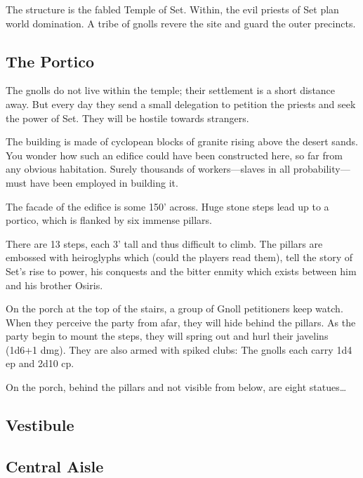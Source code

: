 \documentclass[letterpaper,serif]{rpg-module}
\begin{document}
The structure is the fabled Temple of Set. Within, the evil priests of Set plan world domination.
A tribe of gnolls revere the site and guard the outer precincts.

\subsection{The Portico} %
\label{portico}

The gnolls do not live within the temple; their settlement is a short distance away. But every day they
send a small delegation to petition the priests and seek the power of Set. They will be hostile towards
strangers.

\begin{boxtext}
The building is made of cyclopean blocks of granite rising above the desert sands. You wonder how such
an edifice could have been constructed here, so far from any obvious habitation. Surely thousands of
workers---slaves in all probability---must have been employed in building it.

The facade of the edifice is some 150' across. Huge stone steps lead up to a portico, which is flanked
by six immense pillars.
\end{boxtext}

There are 13 steps, each 3' tall and thus difficult to climb. The pillars are embossed with heiroglyphs
which (could the players read them), tell the story of Set's rise to power, his conquests and the
bitter enmity which exists between him and his brother Osiris.

On the porch at the top of the stairs, a group of Gnoll petitioners keep watch. When they perceive
the party from afar, they will hide behind the pillars. As the party begin to mount the steps, they will
spring out and hurl their javelins (1d6+1 dmg). They are also armed with spiked clubs:
The gnolls each carry 1d4 ep and 2d10 cp.

On the porch, behind the pillars and not visible from below, are eight statues\ldots

\subsection{Vestibule} %

\begin{boxtext}
\lipsum[1]
\end{boxtext}

\lipsum[2]

\subsection{Central Aisle} %
\end{document}
